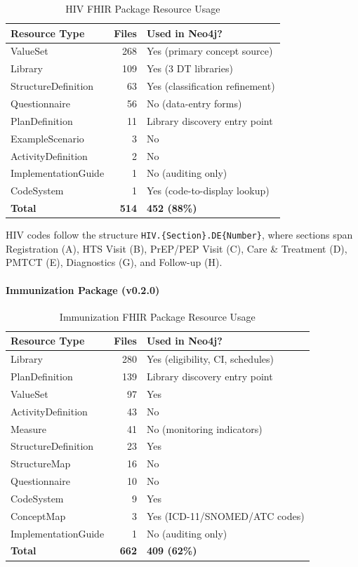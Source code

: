 \begin{table}[H]
\centering
\caption{HIV FHIR Package Resource Usage}
\label{tab:hiv_fhir_resources}
\begin{tabular}{l r l}
\hline
\textbf{Resource Type} & \textbf{Files} & \textbf{Used in Neo4j?} \\
\hline
ValueSet & 268 & Yes (primary concept source) \\
Library & 109 & Yes (3 DT libraries) \\
StructureDefinition & 63 & Yes (classification refinement) \\
Questionnaire & 56 & No (data-entry forms) \\
PlanDefinition & 11 & Library discovery entry point \\
ExampleScenario & 3 & No \\
ActivityDefinition & 2 & No \\
ImplementationGuide & 1 & No (auditing only) \\
CodeSystem & 1 & Yes (code-to-display lookup) \\
\hline
\textbf{Total} & \textbf{514} & \textbf{452 (88\%)} \\
\hline
\end{tabular}
\end{table}

HIV codes follow the structure \texttt{HIV.\{Section\}.DE\{Number\}}, where sections span Registration (A), HTS Visit (B), PrEP/PEP Visit (C), Care \& Treatment (D), PMTCT (E), Diagnostics (G), and Follow-up (H).

\paragraph{Immunization Package (v0.2.0)}

\begin{table}[H]
\centering
\caption{Immunization FHIR Package Resource Usage}
\label{tab:imm_fhir_resources}
\begin{tabular}{l r l}
\hline
\textbf{Resource Type} & \textbf{Files} & \textbf{Used in Neo4j?} \\
\hline
Library & 280 & Yes (eligibility, CI, schedules) \\
PlanDefinition & 139 & Library discovery entry point \\
ValueSet & 97 & Yes \\
ActivityDefinition & 43 & No \\
Measure & 41 & No (monitoring indicators) \\
StructureDefinition & 23 & Yes \\
StructureMap & 16 & No \\
Questionnaire & 10 & No \\
CodeSystem & 9 & Yes \\
ConceptMap & 3 & Yes (ICD-11/SNOMED/ATC codes) \\
ImplementationGuide & 1 & No (auditing only) \\
\hline
\textbf{Total} & \textbf{662} & \textbf{409 (62\%)} \\
\hline
\end{tabular}
\end{table}

